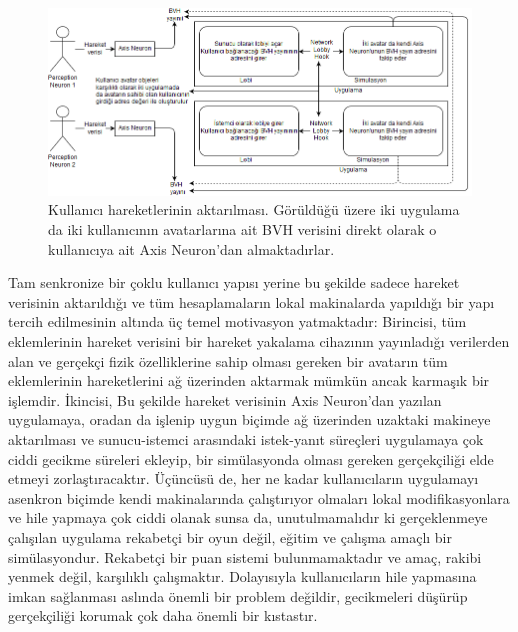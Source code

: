\documentclass[a4paper, 12pt, titlepage]{article}
\begin{document}
\begin{figure}[ht!]
    \centering
        \includegraphics[width=6in]{images/net}
    \caption{Kullanıcı hareketlerinin aktarılması. Görüldüğü üzere iki uygulama da iki kullanıcının
             avatarlarına ait BVH verisini direkt olarak o kullanıcıya ait Axis Neuron’dan
             almaktadırlar.}
    \label{net}
\end{figure}

Tam senkronize bir çoklu kullanıcı yapısı yerine bu şekilde sadece hareket verisinin aktarıldığı ve
tüm hesaplamaların lokal makinalarda yapıldığı bir yapı tercih edilmesinin altında üç temel
motivasyon yatmaktadır: Birincisi, tüm eklemlerinin hareket verisini bir hareket yakalama cihazının
yayınladığı verilerden alan ve gerçekçi fizik özelliklerine sahip olması gereken bir avatarın tüm
eklemlerinin hareketlerini ağ üzerinden aktarmak mümkün ancak karmaşık bir işlemdir. İkincisi, Bu
şekilde hareket verisinin Axis Neuron’dan yazılan uygulamaya, oradan da işlenip uygun biçimde ağ
üzerinden uzaktaki makineye aktarılması ve sunucu-istemci arasındaki istek-yanıt süreçleri
uygulamaya çok ciddi gecikme süreleri ekleyip, bir simülasyonda olması gereken gerçekçiliği elde
etmeyi zorlaştıracaktır. Üçüncüsü de, her ne kadar kullanıcıların uygulamayı asenkron biçimde kendi
makinalarında çalıştırıyor olmaları lokal modifikasyonlara ve hile yapmaya çok ciddi olanak sunsa
da, unutulmamalıdır ki gerçeklenmeye çalışılan uygulama rekabetçi bir oyun değil, eğitim ve çalışma
amaçlı bir simülasyondur. Rekabetçi bir puan sistemi bulunmamaktadır ve amaç, rakibi yenmek değil,
karşılıklı çalışmaktır. Dolayısıyla kullanıcıların hile yapmasına imkan sağlanması aslında önemli
bir problem değildir, gecikmeleri düşürüp gerçekçiliği korumak çok daha önemli bir kıstastır.
\end{document}
